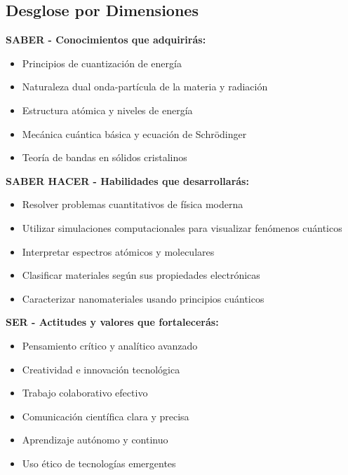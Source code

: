 \documentclass[12pt,a4paper]{book}
\begin{document}
	\subsection{Desglose por Dimensiones}
	
	\begin{saberbox}
		\textbf{SABER - Conocimientos que adquirirás:}
		\begin{itemize}
			\item Principios de cuantización de energía
			\item Naturaleza dual onda-partícula de la materia y radiación
			\item Estructura atómica y niveles de energía
			\item Mecánica cuántica básica y ecuación de Schrödinger
			\item Teoría de bandas en sólidos cristalinos
		\end{itemize}
	\end{saberbox}
	
	\begin{saberhacerbox}
		\textbf{SABER HACER - Habilidades que desarrollarás:}
		\begin{itemize}
			\item Resolver problemas cuantitativos de física moderna
			\item Utilizar simulaciones computacionales para visualizar fenómenos cuánticos
			\item Interpretar espectros atómicos y moleculares
			\item Clasificar materiales según sus propiedades electrónicas
			\item Caracterizar nanomateriales usando principios cuánticos
		\end{itemize}
	\end{saberhacerbox}
	
	\begin{serbox}
		\textbf{SER - Actitudes y valores que fortalecerás:}
		\begin{itemize}
			\item Pensamiento crítico y analítico avanzado
			\item Creatividad e innovación tecnológica
			\item Trabajo colaborativo efectivo
			\item Comunicación científica clara y precisa
			\item Aprendizaje autónomo y continuo
			\item Uso ético de tecnologías emergentes
		\end{itemize}
	\end{serbox}
	
\end{document}
